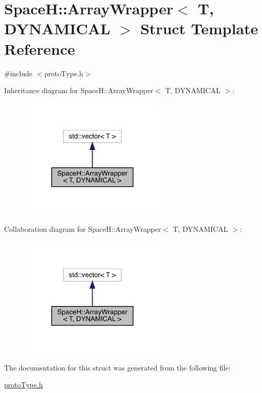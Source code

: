 \hypertarget{struct_space_h_1_1_array_wrapper_3_01_t_00_01_d_y_n_a_m_i_c_a_l_01_4}{}\section{SpaceH\+:\+:Array\+Wrapper$<$ T, D\+Y\+N\+A\+M\+I\+C\+AL $>$ Struct Template Reference}
\label{struct_space_h_1_1_array_wrapper_3_01_t_00_01_d_y_n_a_m_i_c_a_l_01_4}


{\ttfamily \#include $<$proto\+Type.\+h$>$}



Inheritance diagram for SpaceH\+:\+:Array\+Wrapper$<$ T, D\+Y\+N\+A\+M\+I\+C\+AL $>$\+:\nopagebreak
\begin{figure}[H]
\begin{center}
\leavevmode
\includegraphics[width=199pt]{struct_space_h_1_1_array_wrapper_3_01_t_00_01_d_y_n_a_m_i_c_a_l_01_4__inherit__graph}
\end{center}
\end{figure}


Collaboration diagram for SpaceH\+:\+:Array\+Wrapper$<$ T, D\+Y\+N\+A\+M\+I\+C\+AL $>$\+:\nopagebreak
\begin{figure}[H]
\begin{center}
\leavevmode
\includegraphics[width=199pt]{struct_space_h_1_1_array_wrapper_3_01_t_00_01_d_y_n_a_m_i_c_a_l_01_4__coll__graph}
\end{center}
\end{figure}


The documentation for this struct was generated from the following file\+:\begin{DoxyCompactItemize}
\item 
\mbox{\hyperlink{proto_type_8h}{proto\+Type.\+h}}\end{DoxyCompactItemize}
